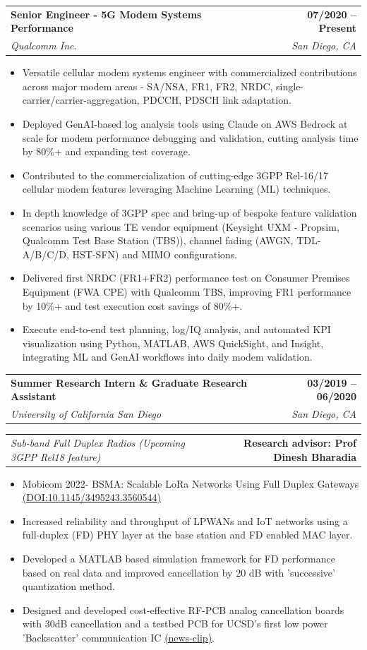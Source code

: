 \documentclass[letterpaper,11pt]{article}
\makeatletter
\newcommand{\resumeItem}[1]{
  \item\small{
    {#1 \vspace{-2pt}}
  }
}
\newcommand{\resumeSubheading}[4]{
  \vspace{-2pt}\item
    \begin{tabular*}{1.0\textwidth}[t]{l@{\extracolsep{\fill}}r}
      \textbf{#1} & \textbf{\small #2} \\
      \textit{\small#3} & \textit{\small #4} \\
    \end{tabular*}\vspace{-7pt}
}
\newcommand{\resumeProjectHeading}[2]{
    \item
    \begin{tabular*}{1.001\textwidth}{l@{\extracolsep{\fill}}r}
      \small#1 & \textbf{\small #2}\\
    \end{tabular*}\vspace{-7pt}
}
\newcommand{\resumeItemListStart}{\begin{itemize}}
\newcommand{\resumeItemListEnd}{\end{itemize}\vspace{-5pt}}
\makeatother
\begin{document}
    \resumeSubheading
      {Senior Engineer - 5G Modem Systems Performance}{07/2020 -- Present}
      {Qualcomm Inc.}{San Diego, CA}
      \resumeItemListStart
      \resumeItem{Versatile cellular modem systems engineer with commercialized contributions across major modem areas - SA/NSA, FR1, FR2, NRDC, single-carrier/carrier-aggregation, PDCCH, PDSCH link adaptation.}
        \resumeItem{Deployed GenAI-based log analysis tools using Claude on AWS Bedrock at scale for modem performance debugging and validation, cutting analysis time by 80\%+ and expanding test coverage.}
        \resumeItem{Contributed to the commercialization of cutting-edge 3GPP Rel-16/17 cellular modem features leveraging Machine Learning (ML) techniques.}
        \resumeItem{In depth knowledge of 3GPP spec and bring-up of bespoke feature validation scenarios using various TE vendor equipment (Keysight UXM - Propsim, Qualcomm Test Base Station (TBS)), channel fading (AWGN, TDL-A/B/C/D, HST-SFN) and MIMO configurations.}
        \resumeItem{Delivered first NRDC (FR1+FR2) performance test on Consumer Premises Equipment (FWA CPE) with Qualcomm TBS, improving FR1 performance by 10\%+ and test execution cost savings of 80\%+.}
        \resumeItem{Execute end-to-end test planning, log/IQ analysis, and automated KPI visualization using Python, MATLAB, AWS QuickSight, and Insight, integrating ML and GenAI workflows into daily modem validation.}
      \resumeItemListEnd
    \resumeSubheading
      {Summer Research Intern \& Graduate Research Assistant}{03/2019 -- 06/2020}
      {University of California San Diego}{San Diego, CA}
      \vspace{-20pt}
      \resumeProjectHeading
          {\textit{\small Sub-band Full Duplex Radios (Upcoming 3GPP Rel18 feature)}}{Research advisor: Prof Dinesh Bharadia}
      \resumeItemListStart
        \resumeItem{Mobicom 2022- BSMA: Scalable LoRa Networks Using Full Duplex Gateways \href{https://rohit1347.github.io/AboutMe/mobicom22-final738.pdf}{(DOI:10.1145/3495243.3560544)}}
        \resumeItem{Increased reliability and throughput of LPWANs and IoT networks using a full-duplex (FD) PHY layer at the base station and FD enabled MAC layer.}
        \resumeItem{Developed a MATLAB based simulation framework for FD performance based on real data and improved cancellation by 20 dB with 'successive' quantization method.}
        \resumeItem{Designed and developed cost-effective RF-PCB analog cancellation boards with 30dB cancellation and a testbed PCB for UCSD’s first low power 'Backscatter' communication IC \href{https://rohit1347.github.io/AboutMe/NewChipBringsUltra-LowPowerWiFiConnectivitytoIoTDevices.pdf}{(news-clip)}.}
    \resumeItemListEnd
    
\end{document}
